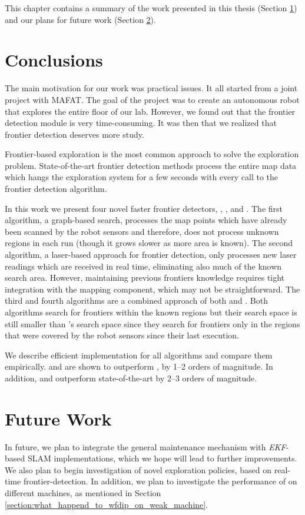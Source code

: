 This chapter contains a summary of the work presented in this thesis
(Section \ref{section:conclusions}) and our plans for future work (Section
\ref{section:future_work}).

\section{Conclusions}
\label{section:conclusions}
The main motivation for our work was practical issues. It all started
from a joint project with MAFAT.
The goal of the project was to create an autonomous robot that explores the
entire floor of our lab.
However, we found out that the frontier detection module is very time-consuming.  
It was then that we realized that frontier detection deserves more study.

Frontier-based exploration is the most common approach to solve the exploration
problem. State-of-the-art frontier detection methods process the entire map data
which hangs the exploration system for a few seconds with every call to the
frontier detection algorithm. 

In this work we present four novel faster frontier detectors, \WFD, \FFD,
\WFDINC and \WFDIP. The first algorithm, a graph-based search, processes the map
points which have already been scanned by the robot sensors and therefore, does
not process unknown regions in each run (though it grows slower as more area is
known). The second algorithm, a laser-based approach for frontier detection,
only processes new laser readings which are received in real time, eliminating
also much of the known search area. However, maintaining previous frontiers
knowledge requires tight integration with the mapping component, which may not
be straightforward. The third and fourth algorithms are a combined approach of
both \WFD and \FFD. Both algorithms search for frontiers within the known
regions but their search space is still smaller than \WFD's search space since
they search for frontiers only in the regions that were covered by the robot
sensors since their last execution. 

We describe efficient implementation for all algorithms and compare them
empirically. \FFD and \WFDIP are shown to outperform \WFD, \WFDINC by 1--2
orders of magnitude. In addition, \FFD and \WFDIP outperform state-of-the-art by
2--3 orders of magnitude.

\section{Future Work}
\label{section:future_work}
In future, we plan to integrate the general maintenance mechanism with
\emph{EKF}-based SLAM implementations, which we hope will lead to further
improvements. We also plan to begin investigation of novel exploration policies,
based on real-time frontier-detection. In addition, we plan to investigate the
performance of \WFDIP on different machines, as mentioned in Section
\ref{section:what_happend_to_wfdip_on_weak_machine}.

